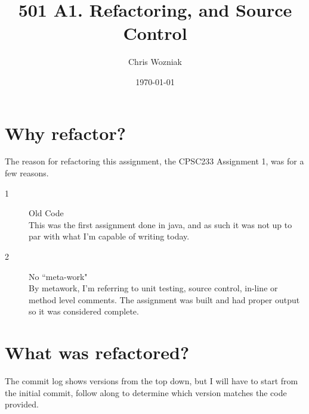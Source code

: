 \documentclass{article}
\title{501 A1. Refactoring, and Source Control}
\author{Chris Wozniak}
\date{\today}
\begin{document}
	\maketitle

	\section*{Why refactor?}
	The reason for refactoring this assignment, the CPSC233 Assignment 1, was for a few reasons.
	\begin{description}
		\item[1] Old Code \\
			This was the first assignment done in java, and as such it was not up to par with what I'm capable of writing today.
		\item[2] No ``meta-work" \\
			By metawork, I'm referring to unit testing, source control, in-line or method level comments. The assignment
			was built and had proper output so it was considered complete.
	\end{description}

	\section*{What was refactored?}
		The commit log shows versions from the top down, but I will have to start from the initial commit, follow 
		along to determine which version matches the code provided.
	
\end{document}
